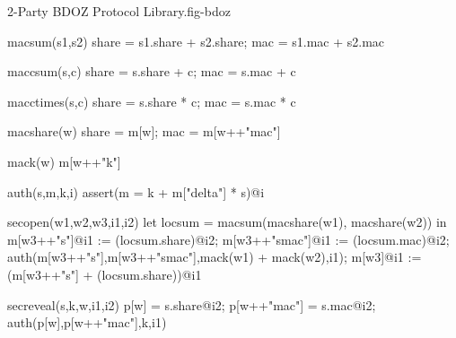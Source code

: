 \begin{fpfig}[t]{2-Party BDOZ Protocol Library.}{fig-bdoz}
{\footnotesize
  \begin{verbatimtab}
    macsum(s1,s2)
    { { share = s1.share + s2.share; mac = s1.mac + s2.mac } }
    
    maccsum(s,c)
    { { share = s.share + c; mac = s.mac + c } }
    
    macctimes(s,c)
    { { share = s.share * c; mac = s.mac * c } }
    
    macshare(w) { {  share = m[w]; mac = m[w++"mac"] } }

    mack(w) { m[w++"k"] }
    
    auth(s,m,k,i) { assert(m = k + m["delta"] * s)@i }
    
    secopen(w1,w2,w3,i1,i2)
    {
      let locsum =  macsum(macshare(w1), macshare(w2)) in
      m[w3++"s"]@i1 := (locsum.share)@i2;
      m[w3++"smac"]@i1 := (locsum.mac)@i2;
      auth(m[w3++"s"],m[w3++"smac"],mack(w1) + mack(w2),i1);
      m[w3]@i1 := (m[w3++"s"] + (locsum.share))@i1
    }

    secreveal(s,k,w,i1,i2)
    {
      p[w] = s.share@i2;
      p[w++"mac"] = s.mac@i2;
      auth(p[w],p[w++"mac"],k,i1)    
    }
  \end{verbatimtab}
}
\end{fpfig}


    
